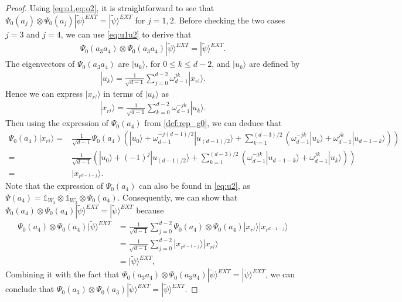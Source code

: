\documentclass[11pt,letterpaper]{article}
\newcommand{\ket}[1]{|#1\rangle}
\newcommand{\x}{\otimes}
\newcommand{\1}{\mathbb{1}}
\newcommand{\EXT}{EXT}
\newcommand{\tpsi}{\tilde{\psi}}
\theoremstyle{definition}
\begin{document}
\begin{proof}
	
	Using \cref{eq:o1,eq:o2}, it is straightforward to see that $\Psi_0(a_j)\x \Psi_0(a_j) \ket{\tpsi}^{\EXT} = \ket{\tpsi}^{\EXT}$ for $j = 1,2$.
	Before checking the two cases $j=3$ and $j=4$, we can use \cref{eq:u1u2} to derive that
	\begin{align*}
		\Psi_0(a_3 a_4) \x\Psi_0(a_3 a_4) \ket{\tpsi}^{\EXT} = \ket{\tpsi}^{\EXT}.
	\end{align*}
	The eigenvectors of $\Psi_0(a_3 a_4)$ are $\ket{u_k}$,
	for $0 \leq k \leq d-2$,
	and $\ket{u_k}$ are defined by
    \begin{align*}
        \ket{u_k} = \frac{1}{\sqrt{d-1}} \sum_{j=0}^{d-2} \omega_{d-1}^{jk} \ket{x_{r^j}}.
    \end{align*}
    Hence we can express $\ket{x_{r^j}}$ in terms of $\ket{u_k}$ as 
    \begin{align*}
        \ket{x_{r^j}} = \frac{1}{\sqrt{d-1}} \sum_{k=0}^{d-2} \omega_{d-1}^{-jk} \ket{u_k}.
    \end{align*}
    Then using the expression of $\Psi_0(a_4)$ from \cref{def:rep_g0},
    we can deduce that
    \begin{align*}
        \Psi_0(a_4) \ket{x_{r^j}} =& \frac{1}{\sqrt{d-1}} \Psi_0(a_4) \left(\ket{u_0} + \omega_{d-1}^{-j(d-1)/2}\ket{u_{(d-1)/2}}  + 
        \sum_{k=1}^{(d-3)/2} (\omega_{d-1}^{-jk} \ket{u_k} + \omega_{d-1}^{jk} \ket{u_{d-1-k}})\right) \\
        =&\frac{1}{\sqrt{d-1}} \left(\ket{u_0} + (-1)^j\ket{u_{(d-1)/2}}  + 
        \sum_{k=1}^{(d-3)/2} (\omega_{d-1}^{-jk} \ket{u_{d-1-k}} + \omega_{d-1}^{jk} \ket{u_{k}})\right) \\
        =& \ket{x_{r^{d-1-j}}}.
    \end{align*}
    Note that the expression of $\Psi_0(a_4)$ can also be found in
    \cref{eq:u2}, as $\Psi(a_4) = \1_{W_2} \x \1_{W_2} \x \Psi_0(a_4)$.
    Consequently, we can show that $\Psi_0(a_4) \x \Psi_0(a_4) \ket{\tpsi}^{\EXT} = \ket{\tpsi}^{\EXT}$ 
    because
    \begin{align*}
        \Psi_0(a_4) \x \Psi_0(a_4) \ket{\tpsi}^{\EXT} &= \frac{1}{\sqrt{d-1}}  \sum_{j=0}^{d-2} \Psi_0(a_4)\x  \Psi_0(a_4) \ket{x_{r^j}} \ket{x_{r^{d-1-j}}} \\
        &= \frac{1}{\sqrt{d-1}} \sum_{j=0}^{d-2} \ket{x_{r^{d-1-j}}} \ket{x_{r^{j}}}\\ &=\ket{\tpsi}^{\EXT},
    \end{align*}
	Combining it with the fact that $\Psi_0(a_3 a_4) \x \Psi_0(a_3 a_4) \ket{\tpsi}^{\EXT} = \ket{\tpsi}^{\EXT}$, we can conclude that
	$\Psi_0(a_3) \x \Psi_0(a_3) \ket{\tpsi}^{\EXT} = \ket{\tpsi}^{\EXT}$.
\end{proof}
\end{document}
